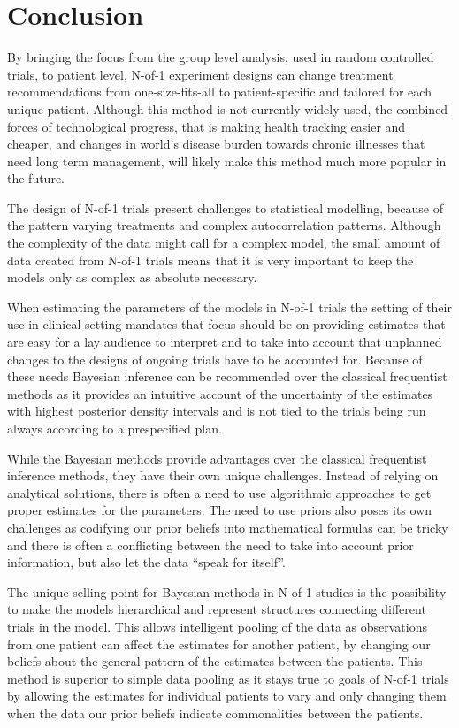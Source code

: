 \documentclass[12pt,a4paper,leqno]{report}
\theoremstyle{plain}
\theoremstyle{definition}
\theoremstyle{remark}
\begin{document}
\chapter{Conclusion}

By bringing the focus from the group level analysis, used in random controlled trials, to patient
level, N-of-1 experiment designs can change treatment
recommendations from one-size-fits-all to patient-specific and tailored for
each unique patient. Although this method is not currently widely
used, the combined forces of technological progress, that is
making health tracking easier and cheaper, and changes in world's disease burden towards
chronic illnesses that need long term management, will likely make this method much more
popular in the future.

The design of N-of-1 trials present challenges to statistical modelling, because
of the pattern varying treatments and complex autocorrelation patterns. Although the complexity
of the data might call for a complex model, the small amount of data created from N-of-1
trials means that it is very important to keep the models only as complex as absolute
necessary.

When estimating the parameters of the models in N-of-1 trials the setting of their use
in clinical setting mandates that focus should be on providing estimates that are
easy for a lay audience to interpret and to take into account that unplanned
changes to the designs of ongoing trials have to be accounted for. Because of these
needs Bayesian inference can be recommended over the classical
frequentist methods as it provides an intuitive account of the uncertainty of the estimates
with highest posterior density intervals and is not tied to the trials being run always
according to a prespecified plan.

While the Bayesian methods provide advantages over the classical frequentist inference
methods, they have their own unique challenges. Instead of relying on analytical
solutions, there is often a need to use algorithmic approaches to get proper
estimates for the parameters. The need to use priors also poses its own challenges as
codifying our prior beliefs into mathematical formulas can be tricky and there is often a
conflicting between the need to take into account prior information, but also let the data ``speak
for itself''.

The unique selling point for Bayesian methods in N-of-1 studies is the possibility to
make the models hierarchical and represent structures connecting different trials in the
model. This allows intelligent pooling of the data as observations from one patient can
affect the estimates for another patient, by changing our beliefs about the general
pattern of the estimates between the patients. This method is superior to simple data pooling
as it stays true to goals of N-of-1 trials by allowing the estimates for individual patients to
vary and only changing them when the data our prior beliefs indicate commonalities
between the patients.
\end{document}
